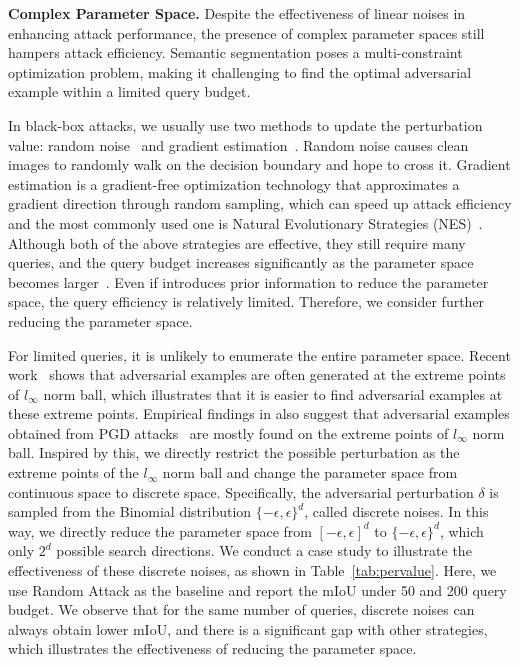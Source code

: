 \documentclass[10pt,twocolumn,letterpaper]{article}
\begin{document}
\textbf{Complex Parameter Space.}
Despite the effectiveness of linear noises in enhancing attack performance, the presence of complex parameter spaces still hampers attack efficiency. Semantic segmentation poses a multi-constraint optimization problem, making it challenging to find the optimal adversarial example within a limited query budget.

In black-box attacks, we usually use two methods to update the perturbation value: random noise~\cite{square,simba} and gradient estimation~\cite{nes,bandits}. Random noise causes clean images to randomly walk on the decision boundary and hope to cross it. Gradient estimation is a gradient-free optimization technology that approximates a gradient direction through random sampling, which can speed up attack efficiency and the most commonly used one is Natural Evolutionary Strategies (NES)~\cite{nes}. 
Although both of the above strategies are effective, they still require many queries, and the query budget increases significantly as the parameter space becomes larger~\cite{bandits}.  
Even if \cite{bandits} introduces prior information to reduce the parameter space, the query efficiency is relatively limited. Therefore, we consider further reducing the parameter space.

For limited queries, it is unlikely to enumerate the entire parameter space. Recent work~\cite{frankwhofe,Parsimonious} shows that adversarial examples are often generated at the extreme points of $l_\infty$ norm ball, which illustrates that it is easier to find adversarial examples at these extreme points. Empirical findings in \cite{Parsimonious} also suggest that adversarial examples obtained from PGD attacks~\cite{pgd} are mostly found on the extreme points of $l_\infty$ norm ball.
Inspired by this, we directly restrict the possible perturbation as the extreme points of the $l_\infty$ norm ball and change the parameter space from continuous space to discrete space. Specifically, the adversarial perturbation $\delta$ is sampled from the Binomial distribution $\{-\epsilon, \epsilon\}^d$, called discrete noises. In this way, we directly reduce the parameter space from $[-\epsilon,\epsilon]^d$ to $\{-\epsilon,\epsilon\}^d$, which only $2^d$ possible search directions.
We conduct a case study to illustrate the effectiveness of these discrete noises, as shown in Table~\ref{tab:pervalue}. Here, we use Random Attack as the baseline and report the mIoU under 50 and 200 query budget. We observe that for the same number of queries, discrete noises can always obtain lower mIoU, and there is a significant gap with other strategies, which illustrates the effectiveness of reducing the parameter space.
\end{document}
